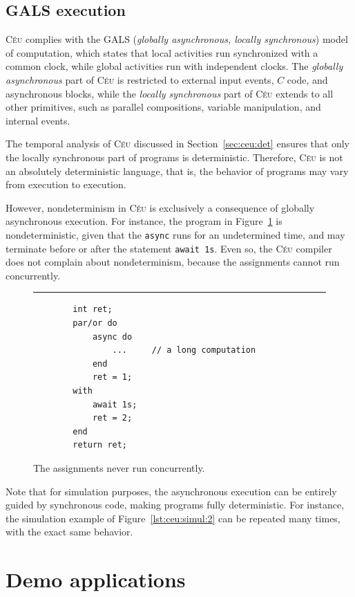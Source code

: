 \documentclass[11pt,a4paper]{article}
\newcommand{\2}{\;\;}
\newcommand{\5}{\;\;\;\;\;}
\newcommand{\CEU}{\textsc{C\'{e}u}}
\newcommand{\code}[1] {{\small{\texttt{#1}}}}
\begin{document}
\subsection{GALS execution}
\label{sec:ceu:gals}

\CEU{} complies with the GALS (\emph{globally asynchronous, locally 
synchronous}) model of computation, which states that local activities run 
synchronized with a common clock, while global activities run with independent 
clocks.
The \emph{globally asynchronous} part of \CEU{} is restricted to external input 
events, $C$ code, and asynchronous blocks, while the \emph{locally synchronous} 
part of \CEU{} extends to all other primitives, such as parallel compositions, 
variable manipulation, and internal events.

The temporal analysis of \CEU{} discussed in Section~\ref{sec:ceu:det} ensures 
that only the locally synchronous part of programs is deterministic.
Therefore, \CEU{} is not an absolutely deterministic language, that is, the 
behavior of programs may vary from execution to execution.

However, nondeterminism in \CEU{} is exclusively a consequence of globally 
asynchronous execution.
For instance, the program in Figure~\ref{lst:ceu:gals} is nondeterministic, 
given that the \code{async} runs for an undetermined time, and may terminate 
before or after the statement \code{await~1s}.
Even so, the \CEU{} compiler does not complain about nondeterminism, because 
the assignments cannot run concurrently.

\begin{figure}[h]
\rule{15cm}{0.37pt}
{\small
\begin{verbatim}
        int ret;
        par/or do
            async do
                ...     // a long computation
            end
            ret = 1;
        with
            await 1s;
            ret = 2;
        end
        return ret;
\end{verbatim}
}
\caption{ The assignments never run concurrently.
\label{lst:ceu:gals}
}
\end{figure}

Note that for simulation purposes, the asynchronous execution can be entirely 
guided by synchronous code, making programs fully deterministic.
For instance, the simulation example of Figure~\ref{lst:ceu:simul:2} can be 
repeated many times, with the exact same behavior.

\newpage
\section{Demo applications}
\label{sec:demos}
\end{document}
